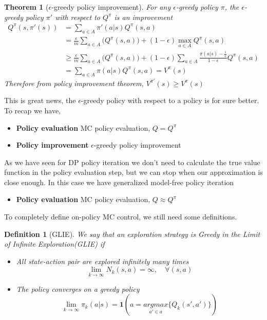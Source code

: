 \documentclass[main.tex]{subfiles}
\newtheorem{theorem}{Theorem}[section]
\newtheorem{definition}{Definition}[section]
\begin{document}
\begin{theorem}[$\epsilon$-greedy policy improvement]
    For any $\epsilon$-greedy policy $\pi$, the $\epsilon$-greedy policy $\pi'$ with respect to $Q^{\pi}$ is an improvement
    \begin{align*}
        Q^{\pi}(s,\pi'(s)) & = \sum_{a \in A} \pi'(a|s) Q^{\pi}(s,a)                                                                                                                       \\
                           & = \frac{\epsilon}{m} \sum_{a \in A} \big( Q^{\pi}(s,a) \big) + (1-\epsilon) \max_{a \in A} Q^{\pi}(s,a)                                                       \\
                           & \geq \frac{\epsilon}{m} \sum_{a \in A} \big( Q^{\pi}(s,a) \big) + (1-\epsilon) \sum_{a \in A} \frac{\pi(a|s) - \frac{1}{\epsilon}}{1 - \epsilon} Q^{\pi}(s,a) \\
                           & = \sum_{a \in A} \pi(a|s) Q^{\pi}(s,a) = V^{\pi}(s)
    \end{align*}
    Therefore from policy improvement theorem, $V^{\pi'}(s) \geq V^{\pi}(s)$
\end{theorem}
\par
\noindent
This is great news, the $\epsilon$-greedy policy with respect to a policy is for sure better.
To recap we have,
\begin{itemize}
    \item \textbf{Policy evaluation} MC policy evaluation, $Q=Q^{\pi}$
    \item \textbf{Policy improvement} $\epsilon$-greedy policy improvement
\end{itemize}
As we have seen for DP policy iteration we don't need to calculate the true value function in the policy evaluation step, but we can stop when our approximation is close enough. In this case we have generalized model-free policy iteration
\begin{itemize}
    \item \textbf{Policy evaluation} MC policy evaluation, $Q \approx Q^{\pi}$
\end{itemize}
To completely define on-policy MC control, we still need some definitions.
\begin{definition}[GLIE]
    We say that an exploration strategy is Greedy in the Limit of Infinite Exploration(GLIE) if
    \begin{itemize}
        \item All state-action pair are explored infinitely many times
              \begin{equation*}
                  \lim_{k \rightarrow \infty} N_k(s,a) = \infty, \quad \forall(s,a)
              \end{equation*}
        \item The policy converges on a greedy policy
              \begin{equation*}
                  \lim_{k \rightarrow \infty} \pi_k(a|s) = \mathbf{1}(a = \underset{a' \in a}{argmax}\{ Q_k(s',a') \})
              \end{equation*}
    \end{itemize}
\end{definition}
\end{document}
